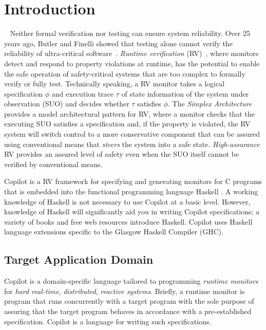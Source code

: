 
\section{Introduction} \label{sec:introduction}

 
Neither formal verification nor testing can ensure system reliability.
Over 25 years ago, Butler and Finelli showed that testing alone cannot verify
the reliability of ultra-critical software~\cite{butler}.
\emph{Runtime verification} (RV)~\cite{monitors}, where monitors
detect and respond to property violations at runtime, has the
potential to enable the safe operation of safety-critical systems that
are too complex to formally verify or fully test.  Technically
speaking, a RV monitor takes a logical specification $\phi$ and
execution trace $\tau$ of state information of the system under
observation (SUO) and decides whether $\tau$ satisfies $\phi$. The
\emph{Simplex Architecture}~\cite{simplex} provides a model
architectural pattern for RV, where a monitor checks that the
executing SUO satisfies a specification and, if the property is
violated, the RV system will switch control to a more conservative
component that can be assured using conventional means that
\emph{steers} the system into a safe state.  \emph{High-assurance} RV
provides an assured level of safety even when the SUO itself cannot be
verified by conventional means.


Copilot is a RV framework for specifying and generating monitors for C programs that is
embedded into the functional programming language Haskell
\cite{PeytonJones02}.  A working knowledge of Haskell is not necessary to use
Copilot at a basic level. However, knowledge of Haskell will significantly aid you in writing Copilot specifications;  a variety of books and free web resources introduce Haskell.
Copilot uses Haskell language extensions
specific to the Glasgow Haskell Compiler (GHC).

\subsection{Target Application Domain} \label{domain}


Copilot is a domain-specific language tailored to programming \emph{runtime
monitors} for \emph{hard real-time}, \emph{distributed}, \emph{reactive systems}.
Briefly, a runtime monitor is program that runs concurrently with a target program
with the sole purpose of assuring that the target program behaves in accordance with a
pre-established specification. Copilot is a language for writing such specifications.

